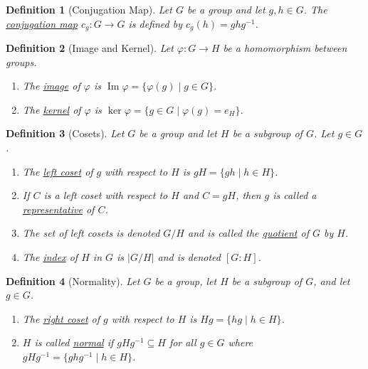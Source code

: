 \documentclass[12pt]{article}
\newtheorem{defn}{Definition}
\numberwithin{problem}{section} %
\numberwithin{defn}{section} %
\numberwithin{thm}{section} %
\numberwithin{exer}{section} %
\theoremstyle{remark}  %
\begin{document}
\setcounter{defn}{21}
\begin{defn}[Conjugation Map]
    Let $G$ be a group and let $g,h\in G$. The \ul{conjugation map} $c_g\operatorname{:} G\to G$ is defined by $c_g(h) = ghg^{-1}$.
\end{defn}

\setcounter{defn}{23}
\begin{defn}[Image and Kernel]
    Let $\varphi\operatorname{:}G\to H$ be a homomorphism between groups.
    \begin{enumerate}
        \item The \ul{image} of $\varphi$ is $\operatorname{Im}\varphi = \{\varphi(g) \mid g \in G\}$.
        \item The \ul{kernel} of $\varphi$ is $\operatorname{ker}\varphi = \{g\in G \mid \varphi(g)=e_H\}$.
    \end{enumerate}
\end{defn}

\setcounter{defn}{26}
\begin{defn}[Cosets]
    Let $G$ be a group and let $H$ be a subgroup of $G$. Let $g\in G$.
    \begin{enumerate}
        \item The \ul{left coset} of $g$ with respect to $H$ is $gH=\{gh \mid h\in H\}$.
        \item If $C$ is a left coset with respect to $H$ and $C=gH$, then $g$ is called a \ul{representative} of $C$.
        \item The set of left cosets is denoted $G/H$ and is called the \ul{quotient} of $G$ by $H$.
        \item The \ul{index} of $H$ in $G$ is $|G/H|$ and is denoted $[G\operatorname{:}H]$.
    \end{enumerate}
\end{defn}

\setcounter{defn}{29}
\begin{defn}[Normality]
    Let $G$ be a group, let $H$ be a subgroup of $G$, and let $g\in G$.
    \begin{enumerate}
        \item The \ul{right coset} of $g$ with respect to $H$ is $Hg= \{hg \mid h \in H\}$.
        \item $H$ is called \ul{normal} if $gHg^{-1}\subseteq H$ for all $g\in G$ where $gHg^{-1}=\{ghg^{-1}\mid h\in H\}$.
    \end{enumerate}
\end{defn}
\end{document}
